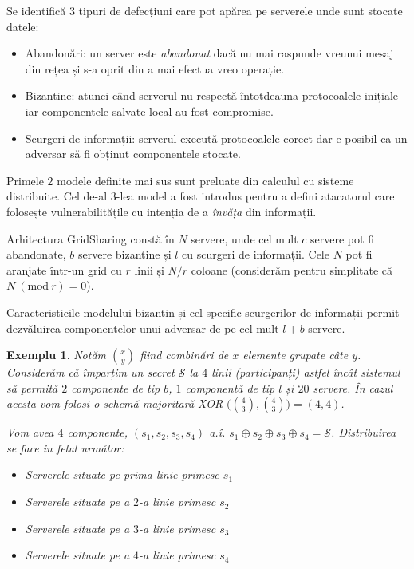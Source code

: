 \documentclass[oneside, 12pt]{book}
\newcommand{\Mod}[1]{\ (\text{mod}\ #1)}
\newtheorem{exemplu}{\textbf{Exemplu}}[section]
\begin{document}
Se identifică 3 tipuri de defecțiuni care pot apărea pe serverele unde sunt stocate datele:
\begin{itemize}
	\item Abandonări: un server este \textit{abandonat} dacă nu mai raspunde vreunui mesaj din rețea și s-a oprit din a mai efectua vreo operație.
	\item Bizantine: atunci când serverul nu respectă întotdeauna protocoalele inițiale iar componentele salvate local au fost compromise.
	\item Scurgeri de informații: serverul execută protocoalele corect dar e posibil ca un adversar să fi obținut componentele stocate.
\end{itemize}
Primele $2$ modele definite mai sus sunt preluate din calculul cu sisteme distribuite. Cel de-al $3$-lea model a fost introdus pentru a defini atacatorul care folosește vulnerabilitățile cu intenția de a \textit{învăța} din informații.

Arhitectura GridSharing constă în $N$ servere, unde cel mult $c$ servere pot fi abandonate, $b$ servere bizantine și $l$ cu scurgeri de informații. Cele $N$ pot fi aranjate într-un grid cu $r$ linii și $N/r$ coloane (considerăm pentru simplitate că $N \Mod r = 0$).

Caracteristicile modelului bizantin și cel specific scurgerilor de informații permit dezvăluirea componentelor unui adversar de pe cel mult $l + b$ servere.

\begin{exemplu}

	Notăm ${x \choose y}$ fiind combinări de $x$ elemente grupate câte $y$.
	Considerăm că împarțim un secret $\mathcal{S}$ la $4$ linii (participanți) astfel încât sistemul să permită $2$ componente de tip $b$, $1$ componentă de tip $l$ și $20$ servere. În cazul acesta vom folosi o schemă majoritară XOR $\big( {4 \choose 3}, {4 \choose 3}\big) = (4,4)$.

	Vom avea $4$ componente, $(s_1, s_2, s_3, s_4)$ a.î. $s_1 \oplus s_2 \oplus s_3 \oplus s_4 = \mathcal{S}$.
	Distribuirea se face in felul următor:
	\begin{itemize}
		\item Serverele situate pe prima linie primesc $s_1$
		\item Serverele situate pe a $2$-a linie primesc $s_2$
		\item Serverele situate pe a $3$-a linie primesc $s_3$
		\item Serverele situate pe a $4$-a linie primesc $s_4$
	\end{itemize}
\end{exemplu}
\end{document}
